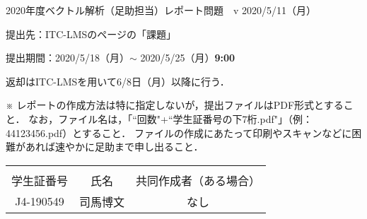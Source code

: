 \documentclass[dvipdfmx,uplatex]{jsarticle}
\newcommand\GAKUSEISHOBANGO{J4-190549}%
\newcommand\NAMAE{司馬博文}%
\newcommand\KYODOSAKUSEISHA{なし}%
\theoremstyle{definition}
\theoremstyle{StatementsWithStar}
\theoremstyle{StatementsWithStar2}
\theoremstyle{StatementsWithStar3}
\theoremstyle{StatementsWithCCirc}
\theoremstyle{definition}
\begin{document}
\thispagestyle{empty}
\setlength{\parindent}{1zw}
\setlength{\baselineskip}{13pt}
\setcounter{section}{4}
\setcounter{version}{3}
\noindent
2020年度ベクトル解析（足助担当）レポート問題~\thesection~v\theversion%
\hfil2020/5/11（月）\par\noindent
提出先：ITC-LMSのページの「課題」\par\noindent
提出期間：2020/5/18（月）$\sim$ 2020/5/25（月）\textbf{9:00}\par\noindent
返却はITC-LMSを用いて6/8日（月）以降に行う．\par\noindent
※ レポートの作成方法は特に指定しないが，提出ファイルはPDF形式とすること．
なお，ファイル名は，「``回数"+``学生証番号の下7桁.pdf\/"」（例：44123456.pdf）とすること．
ファイルの作成にあたって印刷やスキャンなどに困難があれば速やかに足助まで申し出ること．
\vskip-18pt\noindent
\begin{table}[h]
\begin{tabular}{|c|c|c|} \hline
& & \\[-13pt]
学生証番号& 氏名 & 共同作成者（ある場合）\\[2pt] \hline
\rule{0pt}{16pt}%
\parbox[c]{9.2zw}{\GAKUSEISHOBANGO\hfill} & \parbox[c]{13.0zw}{\NAMAE\hfill} & \parbox[c]{25.6zw}{\KYODOSAKUSEISHA\hfill}\\[6pt] \hline
\end{tabular}
\end{table}
\end{document}
